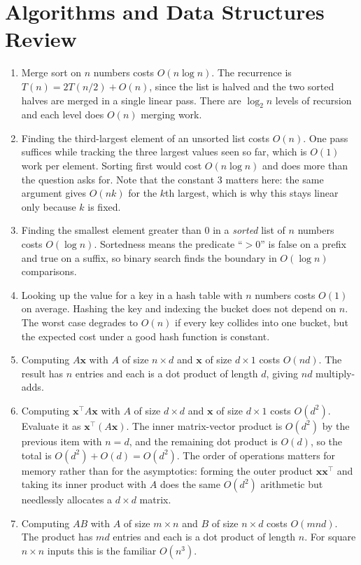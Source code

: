 \documentclass[11pt]{article}
\begin{document}
\section{Algorithms and Data Structures Review}

\begin{enumerate}
  \item Merge sort on $n$ numbers costs $O(n \log n)$. The recurrence is $T(n) = 2T(n/2) + O(n)$,
        since the list is halved and the two sorted halves are merged in a single linear pass. There are
        $\log_2 n$ levels of recursion and each level does $O(n)$ merging work.

  \item Finding the third-largest element of an unsorted list costs $O(n)$. One pass suffices while tracking the
        three largest values seen so far, which is $O(1)$ work per element. Sorting first would cost
        $O(n \log n)$ and does more than the question asks for. Note that the constant 3 matters here: the
        same argument gives $O(nk)$ for the $k$th largest, which is why this stays linear only because
        $k$ is fixed.

  \item Finding the smallest element greater than 0 in a \emph{sorted} list of $n$ numbers costs
        $O(\log n)$. Sortedness means the predicate ``$> 0$'' is false on a prefix and true on a suffix, so binary
        search finds the boundary in $O(\log n)$ comparisons.

  \item Looking up the value for a key in a hash table with $n$ numbers costs $O(1)$ on average. Hashing the
        key and indexing the bucket does not depend on $n$. The worst case degrades to $O(n)$ if every key
        collides into one bucket, but the expected cost under a good hash function is constant.

  \item Computing $A\mathbf{x}$ with $A$ of size $n \times d$ and $\mathbf{x}$ of size $d \times 1$
        costs $O(nd)$. The result has $n$ entries and each is a dot product of length $d$, giving $nd$
        multiply-adds.

  \item Computing $\mathbf{x}^\top A \mathbf{x}$ with $A$ of size $d \times d$ and $\mathbf{x}$ of
        size $d \times 1$ costs $O(d^2)$. Evaluate it as $\mathbf{x}^\top(A\mathbf{x})$. The inner matrix-vector
        product is $O(d^2)$ by the previous item with $n = d$, and the remaining dot product is $O(d)$, so
        the total is $O(d^2) + O(d) = O(d^2)$. The order of operations matters for memory rather than for
        the asymptotics: forming the outer product $\mathbf{x}\mathbf{x}^\top$ and taking its inner
        product with $A$ does the same $O(d^2)$ arithmetic but needlessly allocates a $d \times d$ matrix.

  \item Computing $AB$ with $A$ of size $m \times n$ and $B$ of size $n \times d$ costs $O(mnd)$. The product has
        $md$ entries and each is a dot product of length $n$. For square $n \times n$ inputs this is the
        familiar $O(n^3)$.
\end{enumerate}
\end{document}
